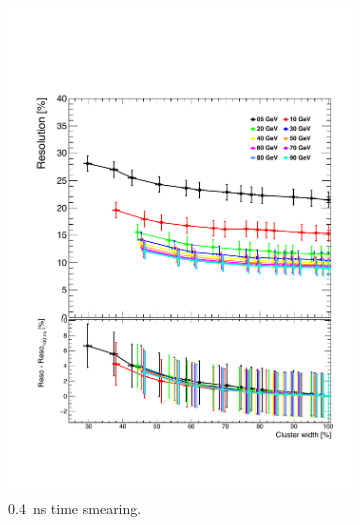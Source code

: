 \begin{figure}[t]
  \centering
  \begin{minipage}{1\textwidth}
    \begin{subfigure}[t]{0.5\textwidth}
      \centering
      \includegraphics[width=1\linewidth]{chap6/fig_TimingILD/0.4ns_Smearing/ShowerWidth_Resolution_Smearing0.4ns}
      \vspace{-6ex}
      \caption{\SI{0.4}{\nano\second} time smearing.} \label{fig:WidthReso0.4ns}
    \end{subfigure}
    \begin{subfigure}[t]{0.5\textwidth}
      \centering

\end{subfigure}
\end{minipage}
\end{figure}
